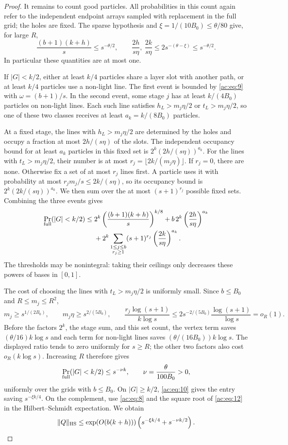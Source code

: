 \begin{proof}
It remains to count good particles. All probabilities in this count again
refer to the independent endpoint arrays sampled with replacement in the full grid;
the holes are fixed. The sparse hypothesis and
\(\xi=1/(10B_0)\le\theta/80\) give, for large \(R\),
\[
 \frac{(b+1)(k+h)}s\le s^{-\theta/2},\qquad
 \frac{2h}{s\eta},\ \frac{2k}{s\eta}
 \le2s^{-(\theta-\xi)}\le s^{-\theta/2}.
\]
In particular these quantities are at most one.

If \(|G|<k/2\), either at least \(k/4\) particles share a layer slot with
another path, or at least \(k/4\) particles use a non-light line. The first
event is bounded by \eqref{ac:eq:9} with \(\omega=(b+1)/s\). In the second
event, some stage \(j\) has at least \(k/(4B_0)\) particles on non-light
lines. Each such line satisfies \(h_L>m_j\eta/2\) or \(t_L>m_j\eta/2\), so
one of these two classes receives at least
\(a_k=k/(8B_0)\) particles.

At a fixed stage, the lines with \(h_L>m_j\eta/2\) are determined by the
holes and occupy a fraction at most \(2h/(s\eta)\) of the slots. The
independent occupancy bound for at least \(a_k\) particles in this fixed set
is \(2^k(2h/(s\eta))^{a_k}\). For the lines with \(t_L>m_j\eta/2\), their
number is at most \(r_j=\lfloor2k/(m_j\eta)\rfloor\). If \(r_j=0\), there
are none. Otherwise fix a set of at most \(r_j\) lines first. A particle
uses it with probability at most \(r_jm_j/s\le2k/(s\eta)\), so its occupancy
bound is \(2^k(2k/(s\eta))^{a_k}\). We then sum over the at most
\((s+1)^{r_j}\) possible fixed sets. Combining the three events gives
\[
\begin{split}
 \Pr_{\rm full}(|G|<k/2)\le {}&
 2^k\left(\frac{(b+1)(k+h)}s\right)^{k/8}
 +b\,2^k\left(\frac{2h}{s\eta}\right)^{a_k}\\
 &+2^k\sum_{\substack{1\le j\le b\\r_j\ge1}}
       (s+1)^{r_j}\left(\frac{2k}{s\eta}\right)^{a_k}.
\end{split}
\]
The thresholds may be nonintegral: taking their ceilings only decreases
these powers of bases in \([0,1]\).

The cost of choosing the lines with \(t_L>m_j\eta/2\) is uniformly small. Since
\(b\le B_0\) and \(R\le m_j\le R^2\),
\[
 m_j\ge s^{1/(2B_0)},\qquad m_j\eta\ge s^{2/(5B_0)},\qquad
 \frac{r_j\log(s+1)}{k\log s}
 \le2s^{-2/(5B_0)}\frac{\log(s+1)}{\log s}=o_R(1).
\]
Before the factors \(2^k\), the stage sum, and this set count, the vertex
term saves \((\theta/16)k\log s\) and each term for non-light lines saves
\((\theta/(16B_0))k\log s\). The displayed ratio tends to zero uniformly for
\(s\ge R\); the other two factors also cost \(o_R(k\log s)\). Increasing
\(R\) therefore gives
\begin{equation}
 \Pr_{\rm full}(|G|<k/2)\le s^{-\nu k},
 \qquad \nu=\frac{\theta}{100B_0}>0,
 \label{ac:eq:12}
\end{equation}
uniformly over the grids with \(b\le B_0\). On \(|G|\ge k/2\),
\eqref{ac:eq:10} gives the entry saving \(s^{-\xi k/4}\). On the complement,
use \eqref{ac:eq:8} and the square root of \eqref{ac:eq:12} in the
Hilbert--Schmidt expectation. We obtain
\[
 \|Q\|_{\rm HS}
 \le \exp(O(b(k+h)))
       \left(s^{-\xi k/4}+s^{-\nu k/2}\right).
\]


\end{proof}
